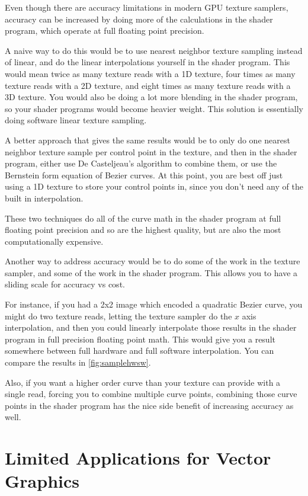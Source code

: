 \documentclass{jcgt}
\begin{document}
Even though there are accuracy limitations in modern GPU texture samplers, accuracy can be increased by doing more of the calculations in the shader program, which operate at full floating point precision.

A naive way to do this would be to use nearest neighbor texture sampling instead of linear, and do the linear interpolations yourself in the shader program.  This would mean twice as many texture reads with a 1D texture, four times as many texture reads with a 2D texture, and eight times as many texture reads with a 3D texture.  You would also be doing a lot more blending in the shader program, so your shader programs would become heavier weight.  This solution is essentially doing software linear texture sampling.

A better approach that gives the same results would be to only do one nearest neighbor texture sample per control point in the texture, and then in the shader program, either use De Casteljeau's algorithm to combine them, or use the Bernstein form equation of Bezier curves.  At this point, you are best off just using a 1D texture to store your control points in, since you don't need any of the built in interpolation.

These two techniques do all of the curve math in the shader program at full floating point precision and so are the highest quality, but are also the most computationally expensive.

Another way to address accuracy would be to do some of the work in the texture sampler, and some of the work in the shader program.  This allows you to have a sliding scale for accuracy vs cost.

For instance, if you had a 2x2 image which encoded a quadratic Bezier curve, you might do two texture reads, letting the texture sampler do the $x$ axis interpolation, and then you could linearly interpolate those results in the shader program in full precision floating point math.  This would give you a result somewhere between full hardware and full software interpolation.  You can compare the results in \autoref{fig:samplehwsw}.

Also, if you want a higher order curve than your texture can provide with a single read, forcing you to combine multiple curve points, combining those curve points in the shader program has the nice side benefit of increasing accuracy as well.

\section{Limited Applications for Vector Graphics}
\label{sec:limitedapplicationsforvectorgraphics}
\end{document}
